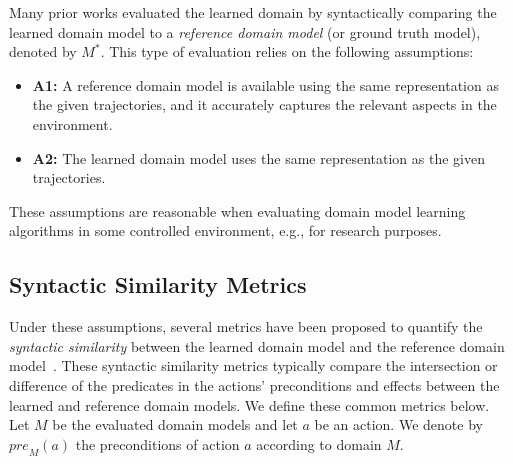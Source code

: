 \documentclass{article}
\theoremstyle{definition}
\theoremstyle{remark}
\newcommand{\realm}{{\ensuremath{M^*}}\xspace}
\newcommand{\pre}{\ensuremath{\textit{pre}}\xspace}
\newif\ifaddcomments
\newcommand{\roni}[1]{\ifaddcomments{\textcolor{red}{[Roni: #1]}}\fi}
\newcommand{\cm}[1]{\ifaddcomments{\textcolor{olive}{[Christian: #1]}}\fi}
\begin{document}
Many prior works evaluated the learned domain by syntactically comparing the learned domain model to a \emph{reference domain model} (or ground truth model), denoted by $\realm$. This type of evaluation relies on the following assumptions:
\begin{itemize}
    \item \textbf{A1:} A reference domain model 
    is available using the same representation as the given trajectories, and it accurately captures the relevant aspects in the environment. 
    \item \textbf{A2:} The learned domain model uses the same representation as the given trajectories. 
\end{itemize}
These assumptions are reasonable when evaluating domain model learning algorithms in some controlled environment, e.g., for research purposes. 


\subsection{Syntactic Similarity Metrics}
Under these assumptions, several metrics have been proposed to quantify the \emph{syntactic similarity} between the learned domain model and the reference domain model~\citep{aineto2019learning,mordoch2023safe,xi2024neuro,Oswald2024DLLMDomainModeling}.
These syntactic similarity metrics typically compare the intersection or difference of the predicates in the actions' preconditions and effects between the learned and reference domain models. We define these common metrics below. 
Let $M$ be the evaluated domain models and let $a$ be an action. We denote by $\pre_M(a)$ the preconditions of action $a$ according to domain $M$.

\end{document}
